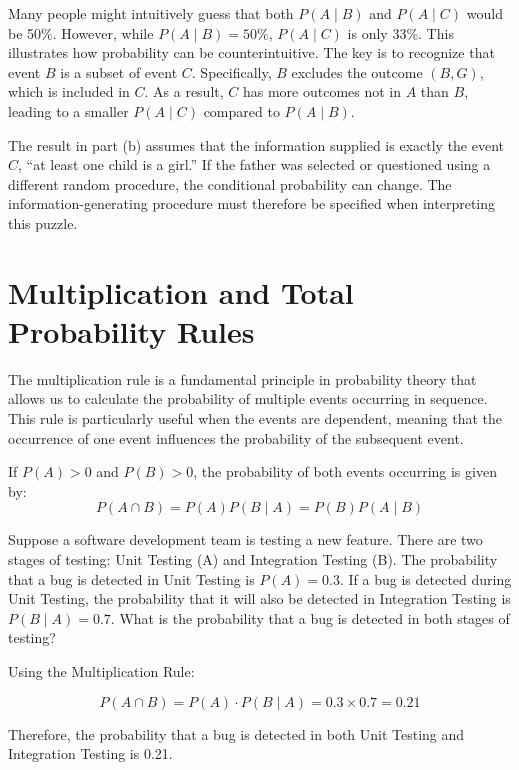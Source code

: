 \begin{remark}
    Many people might intuitively guess that both \( P(A \mid B) \) and \( P(A \mid C) \) would be 50\%. However, while \( P(A \mid B) = 50\%\), \( P(A \mid C) \) is only 33\%. This illustrates how probability can be counterintuitive. The key is to recognize that event \( B \) is a subset of event \( C \). Specifically, \( B \) excludes the outcome \( (B, G) \), which is included in \( C \). As a result, \( C \) has more outcomes not in \( A \) than \( B \), leading to a smaller \( P(A \mid C) \) compared to \( P(A \mid B) \).

    The result in part (b) assumes that the information supplied is exactly the event \(C\), “at least one child is a girl.” If the father was selected or questioned using a different random procedure, the conditional probability can change. The information-generating procedure must therefore be specified when interpreting this puzzle.
\end{remark}

\section{Multiplication and Total Probability Rules}
The multiplication rule is a fundamental principle in probability theory that allows us to calculate the probability of multiple events occurring in sequence. This rule is particularly useful when the events are dependent, meaning that the occurrence of one event influences the probability of the subsequent event.

\begin{theorem}
    If \(P(A)>0\) and \(P(B)>0\), the probability of both events occurring is given by:
    \[
    P(A \cap B) = P(A) P(B \mid A) = P(B) P(A \mid B)
    \]
\end{theorem}

\begin{example}
    Suppose a software development team is testing a new feature. There are two stages of testing: Unit Testing (A) and Integration Testing (B). The probability that a bug is detected in Unit Testing is $P(A)=0.3$. If a bug is detected during Unit Testing, the probability that it will also be detected in Integration Testing is $P(B \mid A) = 0.7$. What is the probability that a bug is detected in both stages of testing?
\end{example}

\begin{solution}
    Using the Multiplication Rule:

\[
P(A \cap B)=P(A) \cdot P(B \mid A)=0.3 \times 0.7=0.21
\]


Therefore, the probability that a bug is detected in both Unit Testing and Integration Testing is 0.21.
\end{solution}

